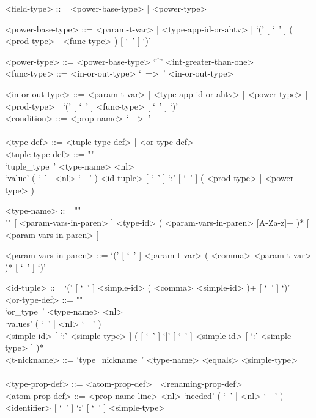 \documentclass{article}
\begin{document}
\begin{grammar}
<field-type> ::= <power-base-type> | <power-type>

<power-base-type> ::=
<param-t-var> | <type-app-id-or-ahtv> |
`(' [ `\ ' ] ( <prod-type> | <func-type> ) [ `\ ' ] `)'

<power-type> ::= <power-base-type> `^' <int-greater-than-one>
\\

<func-type> ::= <in-or-out-type> `\ =>\ ' <in-or-out-type>

<in-or-out-type> ::=
<param-t-var> | <type-app-id-or-ahtv> | <power-type> | <prod-type> |
`(' [ `\ ' ] <func-type>  [ `\ ' ] `)'
\\

<condition> ::= <prop-name> `\ -->\ '
\\
\\

\newpage
<type-def> ::= <tuple-type-def> | <or-type-def>
\\

<tuple-type-def> ::= ""\\
`tuple_type\ ' <type-name> <nl> \\
`value' ( `\ ' | <nl> `\ \ ' )
<id-tuple> [ `\ ' ] `:' [ `\ ' ] ( <prod-type> | <power-type> )

<type-name> ::= ""\\""
[ <param-vars-in-paren> ] <type-id> ( <param-vars-in-paren> [A-Za-z]+ )*
[ <param-vars-in-paren> ]

<param-vars-in-paren> ::=
`(' [ `\ ' ] <param-t-var> ( <comma> <param-t-var> )* [ `\ ' ] `)'

<id-tuple> ::= `(' [ `\ ' ] <simple-id> ( <comma> <simple-id> )+ [ `\ ' ] `)'
\\

<or-type-def> ::= ""\\
`or_type\ ' <type-name> <nl> \\
`values' ( `\ ' | <nl> `\ \ ' ) \\
<simple-id> [ `:' <simple-type> ]
( [ `\ ' ] `|' [ `\ ' ] <simple-id> [ `:' <simple-type> ] )*
\\

<t-nickname> ::=
`type_nickname\ ' <type-name> <equals> <simple-type>
\\\\

<type-prop-def> ::= <atom-prop-def> | <renaming-prop-def>
\\

<atom-prop-def> ::=
<prop-name-line> <nl> `needed' ( `\ ' | <nl> `\ \ ' )
<identifier> [ `\ ' ] `:' [ `\ ' ] <simple-type>


\end{grammar}
\end{document}
